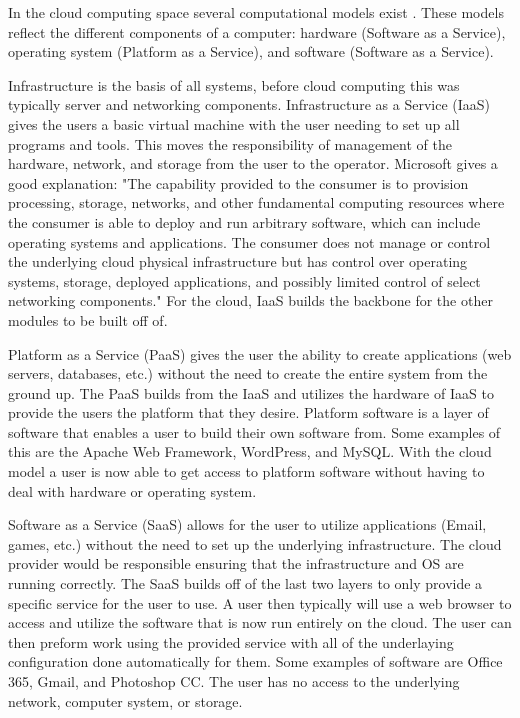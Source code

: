 \documentclass[12pt]{article}
\begin{document}
In the cloud computing space several computational models exist \cite{neto2011demystifying}. These models reflect the different components of a computer: hardware (Software as a Service), operating system (Platform as a Service), and software (Software as a Service).

Infrastructure is the basis of all systems, before cloud computing this was typically server and networking components. Infrastructure as a Service (IaaS) gives the users a basic virtual machine with the user needing to set up all programs and tools. This moves the responsibility of management of the hardware, network, and storage from the user to the operator.  Microsoft gives a good explanation: "The capability provided to the consumer is to provision processing, storage, networks, and other fundamental computing resources where the consumer is able to deploy and run arbitrary software, which can include operating systems and applications. The consumer does not manage or control the underlying cloud physical infrastructure but has control over operating systems, storage, deployed applications, and possibly limited control of select networking components." \cite{TechWikiMic} For the cloud, IaaS builds the backbone for the other modules to be built off of.

Platform as a Service (PaaS) gives the user the ability to create applications (web servers, databases, etc.) without the need to create the entire system from the ground up. The PaaS builds from the IaaS and utilizes the hardware of IaaS to provide the users the platform that they desire. Platform software is a layer of software that enables a user to build their own software from. Some examples of this are the Apache Web Framework\cite{apache}, WordPress\cite{wordpress}, and MySQL\cite{mySql}. With the cloud model a user is now able to get access to platform software without having to deal with hardware or operating system.

Software as a Service (SaaS) allows for the user to utilize applications (Email, games, etc.) without the need to set up the underlying infrastructure. The cloud provider would be responsible ensuring that the infrastructure and OS are running correctly. The SaaS builds off of the last two layers to only provide a specific service for the user to use. A user then typically will use a web browser to access and utilize the software that is now run entirely on the cloud. The user can then preform work using the provided service with all of the underlaying configuration done automatically for them. Some examples of software are Office 365\cite{office}, Gmail\cite{gmail}, and Photoshop CC\cite{photoshop}. The user has no access to the underlying network, computer system, or storage.
\end{document}
